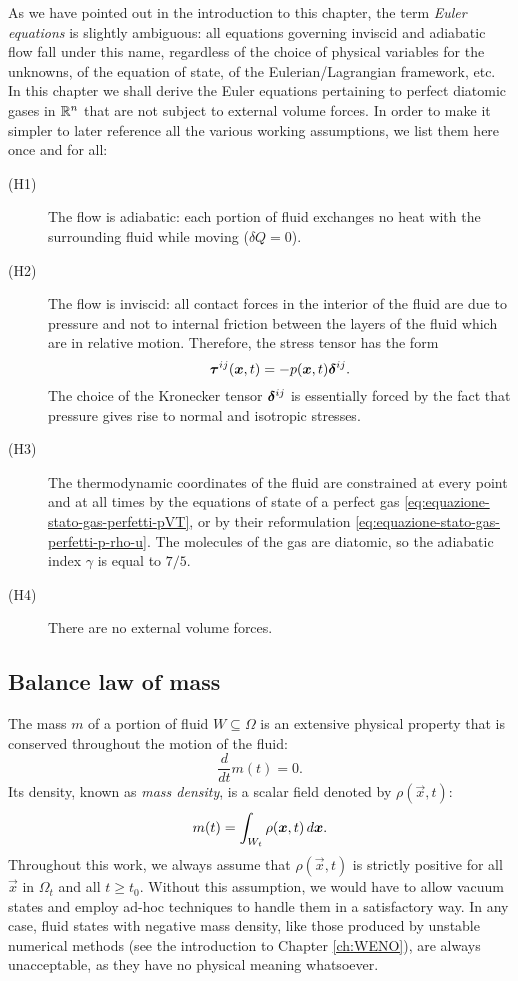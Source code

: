As we have pointed out in the introduction to this chapter,
the term \emph{Euler equations} is slightly ambiguous: all equations
governing inviscid and adiabatic flow fall under this name,
regardless of the choice of physical variables for the unknowns,
of the equation of state, of the Eulerian/Lagrangian framework, etc.
In this chapter we shall derive the Euler equations pertaining
to perfect diatomic gases in $\mathbb{R}^n$ that are not subject to external
volume forces. In order to make it simpler to later reference all the
various working assumptions, we list them here once and for all:
\begin{description}
\item[(H1)] The flow is adiabatic: each portion of fluid exchanges
	no heat with the surrounding fluid while moving ($\delta Q = 0$).
\item[(H2)] The flow is inviscid: all contact forces in the interior
	of the fluid are due to pressure and not to internal friction
	between the layers of the fluid which are in relative motion.
	Therefore, the stress tensor has the form
	\[
	\bm{\tau}^{ij}(\bm{x},t) = -p(\bm{x},t) \bm{\delta}^{ij}.
	\]
	The choice of the Kronecker tensor $\bm{\delta}^{ij}$ is essentially forced
	by the fact that pressure gives rise to normal and isotropic stresses.
\item[(H3)] The thermodynamic coordinates of the fluid are constrained
	at every point and at all times by the equations of state
	of a perfect gas \eqref{eq:equazione-stato-gas-perfetti-pVT},
	or by their reformulation \eqref{eq:equazione-stato-gas-perfetti-p-rho-u}.
	The molecules of the gas are diatomic, so the adiabatic index
	$\gamma$ is equal to $7/5$.
\item[(H4)] There are no external volume forces.
\end{description}

\subsection*{Balance law of mass}

The mass $m$ of a portion of fluid $W \subseteq \Omega$ is an
extensive physical property that is conserved throughout the motion of the fluid:
\[
\frac{d}{dt} m(t) = 0.
\]
Its density, known as \emph{mass density}, is a scalar field
denoted by $\rho(\vec{x},t)$:
\[
m(t) = \int_{W_t} \rho(\bm{x},t) \, d\bm{x}.
\]
Throughout this work, we always assume that $\rho(\vec{x},t)$ is strictly
positive for all $\vec{x}$ in $\Omega_t$ and all $t \geq t_0$.
Without this assumption, we would have to allow vacuum states
and employ ad-hoc techniques to handle them in a satisfactory way.
In any case, fluid states with negative mass density, like those
produced by unstable numerical methods (see the introduction
to Chapter \ref{ch:WENO}), are always unacceptable,
as they have no physical meaning whatsoever.

